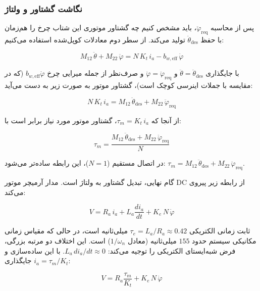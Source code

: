 \subsubsection{نگاشت گشتاور و ولتاژ}

پس از محاسبه $\ddot\varphi_{\text{req}}$، باید مشخص کنیم چه گشتاور موتوری این شتاب چرخ را هم‌زمان با حفظ $\ddot\theta_{\text{des}}$ تولید می‌کند. از سطر دوم معادلات کوپل‌شده استفاده می‌کنیم:

\begin{equation}
    M_{12}\,\ddot\theta + M_{22}\,\ddot\varphi = N\,K_t\, i_a - b_{w,\text{eff}}\,\dot\varphi
\end{equation}

با جایگذاری $\ddot\theta = \ddot\theta_{\text{des}}$ و $\ddot\varphi = \ddot\varphi_{\text{req}}$ و صرف‌نظر از جمله میرایی چرخ $b_{w,\text{eff}}\dot\varphi$ (که در مقایسه با جملات اینرسی کوچک است)، گشتاور موتور به صورت زیر به دست می‌آید:

\begin{equation}
    N\,K_t\, i_a = M_{12}\,\ddot\theta_{\text{des}} + M_{22}\,\ddot\varphi_{\text{req}}
\end{equation}

از آنجا که $\tau_m = K_t\, i_a$، گشتاور موتور مورد نیاز برابر است با:

\begin{equation}
    \boxed{\tau_m = \frac{M_{12}\,\ddot\theta_{\text{des}} + M_{22}\,\ddot\varphi_{\text{req}}}{N}}
\end{equation}

در اتصال مستقیم ($N = 1$)، این رابطه ساده‌تر می‌شود: $\tau_m = M_{12}\,\ddot\theta_{\text{des}} + M_{22}\,\ddot\varphi_{\text{req}}$.

گام نهایی، تبدیل گشتاور به ولتاژ است. مدار آرمیچر موتور DC از رابطه زیر پیروی می‌کند:

\begin{equation}
    V = R_a\, i_a + L_a \frac{di_a}{dt} + K_e\, N\, \dot\varphi
\end{equation}

ثابت زمانی الکتریکی $\tau_e = L_a / R_a \approx 0.42$ میلی‌ثانیه است، در حالی که مقیاس زمانی مکانیکی سیستم حدود $155$ میلی‌ثانیه (معادل $1/\omega_n$) است. این اختلاف دو مرتبه بزرگی، فرض شبه‌ایستای الکتریکی را توجیه می‌کند: $L_a\, di_a/dt \approx 0$. با این ساده‌سازی و جایگذاری $i_a = \tau_m / K_t$:

\begin{equation}
    \boxed{V = R_a \frac{\tau_m}{K_t} + K_e\, N\, \dot\varphi}
\end{equation}

